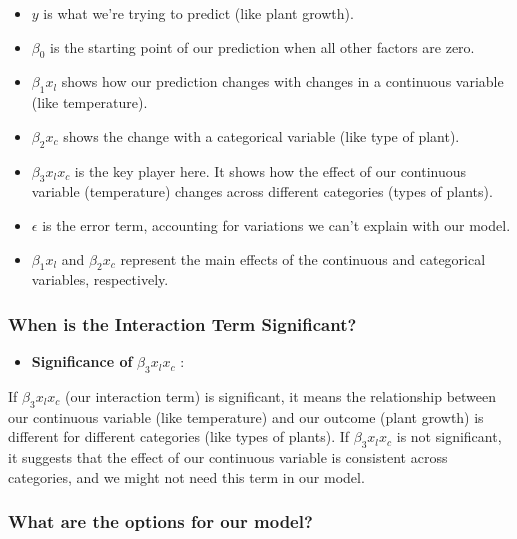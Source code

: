 \documentclass[
  letterpaper,
  DIV=11,
  numbers=noendperiod]{scrreprt}
\providecommand{\tightlist}{%
  \setlength{\itemsep}{0pt}\setlength{\parskip}{0pt}}
\begin{document}
\begin{itemize}
\tightlist
\item
  \(y\) is what we're trying to predict (like plant growth).
\item
  \(\beta_0\) is the starting point of our prediction when all other
  factors are zero.
\item
  \(\beta_1x_l\) shows how our prediction changes with changes in a
  continuous variable (like temperature).
\item
  \(\beta_2x_c\) shows the change with a categorical variable (like type
  of plant).
\item
  \(\beta_3x_lx_c\) is the key player here. It shows how the effect of
  our continuous variable (temperature) changes across different
  categories (types of plants).
\item
  \(\epsilon\) is the error term, accounting for variations we can't
  explain with our model.
\item
  \(\beta_1x_l\) and \(\beta_2x_c\) represent the main effects of the
  continuous and categorical variables, respectively.
\end{itemize}

\subsubsection{When is the Interaction Term
Significant?}\label{when-is-the-interaction-term-significant}

\begin{itemize}
\tightlist
\item
  \textbf{Significance of} \(\beta_3x_lx_c\) :
\end{itemize}

If \(\beta_3x_lx_c\) (our interaction term) is significant, it means the
relationship between our continuous variable (like temperature) and our
outcome (plant growth) is different for different categories (like types
of plants). If \(\beta_3x_lx_c\) is not significant, it suggests that
the effect of our continuous variable is consistent across categories,
and we might not need this term in our model.

\subsubsection{What are the options for our
model?}\label{what-are-the-options-for-our-model}
\end{document}
